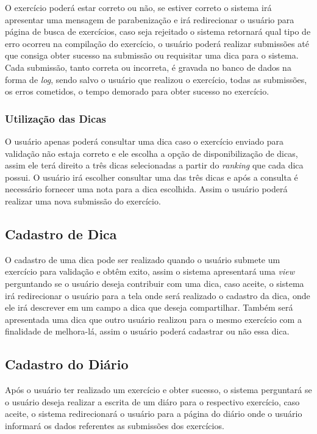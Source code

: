 O exercício poderá estar correto ou não, se estiver correto o sistema irá apresentar uma mensagem de parabenização e irá redirecionar o usuário para página de busca de exercícios, caso seja rejeitado o sistema retornará qual tipo de erro ocorreu na compilação do exercício, o usuário poderá realizar submissões até que consiga obter sucesso na submissão ou requisitar uma dica para o sistema. Cada submissão, tanto correta ou incorreta, é gravada no banco de dados na forma de \textit{log}, sendo salvo o usuário que realizou o exercício, todas as submissões, os erros cometidos, o tempo demorado para obter sucesso no exercício.

\subsubsection{Utilização das Dicas}

O usuário apenas poderá consultar uma dica caso o exercício enviado para validação não estaja correto e ele escolha a opção de disponibilização de dicas, assim ele terá direito a três dicas selecionadas a partir do \textit{ranking} que cada dica possui. O usuário irá escolher consultar uma das três dicas e após a consulta é necessário fornecer uma nota para a dica escolhida. Assim o usuário poderá realizar uma nova submissão do exercício.


\subsection{Cadastro de Dica}

O cadastro de uma dica pode ser realizado quando o usuário submete um exercício para validação e obtêm exito, assim o sistema apresentará uma \textit{view} perguntando se o usuário deseja contribuir com uma dica, caso aceite, o sistema irá redirecionar o usuário para a tela onde será realizado o cadastro da dica, onde ele irá descrever em um campo a dica que deseja compartilhar. Também será apresentada uma dica que outro usuário realizou para o mesmo exercício com a finalidade de melhora-lá, assim o usuário poderá cadastrar ou não essa dica.

\subsection{Cadastro do Diário}

Após o usuário ter realizado um exercício e obter sucesso, o sistema perguntará se o usuário deseja realizar a escrita de um diáro para o respectivo exercício, caso aceite, o sistema redirecionará o usuário para a página do diário onde o usuário informará os dados referentes as submissões dos exercícios.

